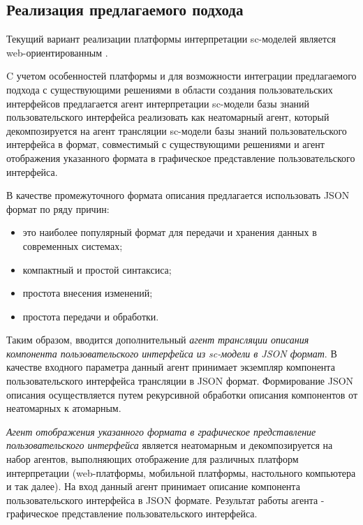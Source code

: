\begin{SCn}
\section{Реализация предлагаемого подхода}

Текущий вариант реализации платформы интерпретации sc-моделей является web-ориентированным \cite{web-platform}.

C учетом особенностей платформы и для возможности интеграции предлагаемого подхода с существующими решениями в области создания пользовательских интерфейсов предлагается агент интерпретации sc-модели базы знаний пользовательского интерфейса реализовать как неатомарный агент, который декомпозируется на агент трансляции sc-модели базы знаний пользовательского интерфейса в формат, совместимый с существующими решениями и агент отображения указанного формата в графическое представление пользовательского интерфейса.

В качестве промежуточного формата описания предлагается использовать JSON формат по ряду причин:
\begin{itemize}
	\item это наиболее популярный формат для передачи и хранения данных в современных системах;
	\item компактный и простой синтаксиса;
	\item простота внесения изменений;
	\item простота передачи и обработки.
\end{itemize}

Таким образом, вводится дополнительный \textit{агент трансляции описания компонента пользовательского интерфейса из sc-модели в JSON формат}. В качестве входного параметра данный агент принимает экземпляр компонента пользовательского интерфейса трансляции в JSON формат. Формирование JSON описания осуществляется путем рекурсивной обработки описания компонентов от неатомарных к атомарным.

\textit{Агент отображения указанного формата в графическое представление пользовательского интерфейса} является неатомарным и декомпозируется на набор агентов, выполняющих отображение для различных платформ интерпретации (web-платформы, мобильной платформы, настольного компьютера и так далее). На вход данный агент принимает описание компонента пользовательского интерфейса в JSON формате. Результат работы агента - графическое представление пользовательского интерфейса.

\scnendstruct \scnendcurrentsectioncomment
\end{SCn}